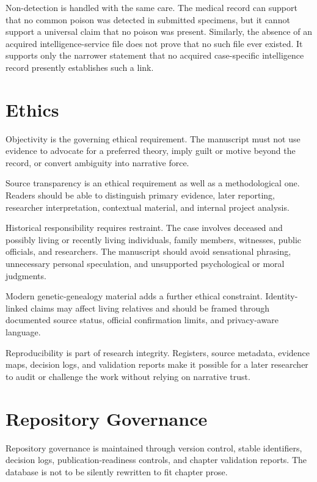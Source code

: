 Non-detection is handled with the same care. The medical record can support that no common poison was detected in submitted specimens, but it cannot support a universal claim that no poison was present. Similarly, the absence of an acquired intelligence-service file does not prove that no such file ever existed. It supports only the narrower statement that no acquired case-specific intelligence record presently establishes such a link.

\section{Ethics}

Objectivity is the governing ethical requirement. The manuscript must not use evidence to advocate for a preferred theory, imply guilt or motive beyond the record, or convert ambiguity into narrative force.

Source transparency is an ethical requirement as well as a methodological one. Readers should be able to distinguish primary evidence, later reporting, researcher interpretation, contextual material, and internal project analysis.

Historical responsibility requires restraint. The case involves deceased and possibly living or recently living individuals, family members, witnesses, public officials, and researchers. The manuscript should avoid sensational phrasing, unnecessary personal speculation, and unsupported psychological or moral judgments.

Modern genetic-genealogy material adds a further ethical constraint. Identity-linked claims may affect living relatives and should be framed through documented source status, official confirmation limits, and privacy-aware language.

Reproducibility is part of research integrity. Registers, source metadata, evidence maps, decision logs, and validation reports make it possible for a later researcher to audit or challenge the work without relying on narrative trust.

\section{Repository Governance}

Repository governance is maintained through version control, stable identifiers, decision logs, publication-readiness controls, and chapter validation reports. The database is not to be silently rewritten to fit chapter prose.


